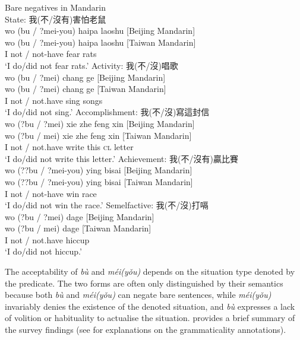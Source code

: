 \documentclass[output=paper]{langscibook}
\begin{document}
\ea Bare negatives in Mandarin \label{ex:lam12}\\
  \ea State: {\cn 我(不/沒有)害怕老鼠} \label{ex:lam12a}\\
  	\glll wo	{(bu / ?mei-you)}	haipa	laoshu	{[Beijing Mandarin]}\\
	{wo} {(bu / ?mei-you)}	{haipa} {laoshu} {[Taiwan Mandarin]}\\
	I {not / not-have} fear rats\\
	\glt `I do/did not fear rats.'
  \ex Activity: {\cn 我(不/沒)唱歌} \label{ex:lam12b}\\
  	\glll wo	{(bu / ?mei)}	chang	ge	{[Beijing Mandarin]}\\
	  {wo}	{(bu / ?mei)} {chang} {ge} {[Taiwan Mandarin]}\\
	I {not / not.have} sing songs\\
	\glt `I do/did not sing.'
  \ex Accomplishment: {\cn 我(不/沒)寫這封信} \label{ex:lam12c}\\
	\glll wo	 {(?bu / ?mei)} xie zhe feng xin {[Beijing Mandarin]}\\
	{wo} {(?bu / mei)} {xie} {zhe} {feng} {xin} {[Taiwan Mandarin]}\\
	I {not / not.have} write this \textsc{cl} letter\\
	\glt `I do/did not write this letter.'
  \ex Achievement: {\cn 我(不/沒有)贏比賽} \label{ex:lam12d}\\
  	\glll wo	 {(??bu / ?mei-you)} ying bisai {[Beijing Mandarin]}\\
  	{wo} {(??bu / ?mei-you)} {ying} {bisai} {[Taiwan Mandarin]}\\
  	I {not / not-have} win race\\
  	\glt `I do/did not win the race.'
  \ex Semelfactive: {\cn 我(不/沒)打嗝} \label{ex:lam12e}\\
	\glll wo {(?bu / ?mei)} dage {[Beijing Mandarin]}\\
	{wo} {(?bu / mei)} {dage} {[Taiwan Mandarin]}\\
	I {not / not.have} hiccup\\
	\glt `I do/did not hiccup.'
\z \z 

The acceptability of \textit{bù} and \textit{méi(yǒu)} depends on the situation type denoted by the predicate. The two forms are often only distinguished by their semantics because both \textit{bù} and \textit{méi(yǒu)} can negate bare sentences, while \textit{méi(yǒu)} invariably denies the existence of the denoted situation, and \textit{bù} expresses a lack of volition or habituality to actualise the situation.  provides a brief summary of the survey findings (see  for explanations on the grammaticality annotations).
\end{document}
